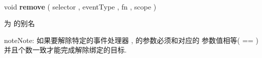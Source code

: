 \documentclass[letterpaper,10pt,english]{sphinxmanual}
\begin{document}

\begin{fulllineitems}
\label{api/core/event/detach:Event.remove}~
\begin{DUlineblock}{0em}
\item[] void \textbf{remove} ( selector , eventType , fn , scope )
\item[] 为 {\hyperref[api/core/event/detach:Event.detach]{}} 的别名
\end{DUlineblock}

\begin{notice}{note}{Note:}
如果要解除特定的事件处理器 ,  的参数必须和对应的  参数值相等( == )并且个数一致才能完成解除绑定的目标.
\end{notice}

\end{fulllineitems}
\end{document}
